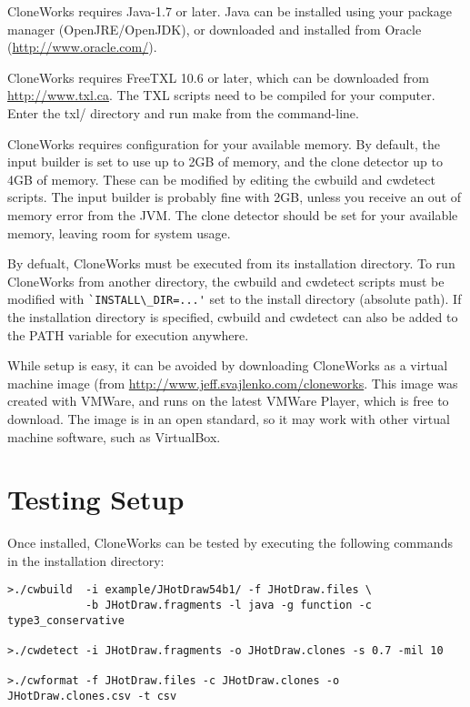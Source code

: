 \documentclass[]{article}
\begin{document}
	CloneWorks requires Java-1.7 or later.  Java can be installed using your package manager (OpenJRE/OpenJDK), or downloaded and installed from Oracle (\url{http://www.oracle.com/}).
	
	CloneWorks requires FreeTXL 10.6 or later, which can be downloaded from \url{http://www.txl.ca}.  The TXL scripts need to be compiled for your computer.  Enter the txl/ directory and run make from the command-line.
	
	CloneWorks requires configuration for your available memory.  By default, the input builder is set to use up to 2GB of memory, and the clone detector up to 4GB of memory.  These can be modified by editing the cwbuild and cwdetect scripts.  The input builder is probably fine with 2GB, unless you receive an out of memory error from the JVM.  The clone detector should be set for your available memory, leaving room for system usage.
	
	By defualt, CloneWorks must be executed from its installation directory. To run CloneWorks from another directory, the cwbuild and cwdetect scripts must be modified with \verb|`INSTALL\_DIR=...'| set to the install directory (absolute path). If the installation directory is specified, cwbuild and cwdetect can also be added to the PATH variable for execution anywhere.
	
	While setup is easy, it can be avoided by downloading CloneWorks as a virtual machine image (from \url{http://www.jeff.svajlenko.com/cloneworks}.  This image was created with VMWare, and runs on the latest VMWare Player, which is free to download.  The image is in an open standard, so it may work with other virtual machine software, such as VirtualBox.
	
\section{Testing Setup}
	Once installed, CloneWorks can be tested by executing the following commands in the installation directory:
	
	\begin{verbatim}
>./cwbuild  -i example/JHotDraw54b1/ -f JHotDraw.files \
            -b JHotDraw.fragments -l java -g function -c type3_conservative
            
>./cwdetect -i JHotDraw.fragments -o JHotDraw.clones -s 0.7 -mil 10

>./cwformat -f JHotDraw.files -c JHotDraw.clones -o JHotDraw.clones.csv -t csv
	\end{verbatim}
	
\end{document}
